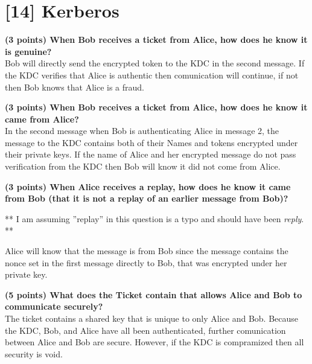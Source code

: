 \documentclass[letterpaper,11pt,notitlepage,fleqn]{article}
\begin{document}
\section{[14] Kerberos}
\noindent\textbf{(3 points) When Bob receives a ticket from Alice, how does he know it is genuine?} \\
Bob will directly send the encrypted token to the KDC in the second message. If the KDC verifies that Alice is authentic then comunication will continue, if not then Bob knows that Alice is a fraud.

\noindent\textbf{(3 points) When Bob receives a ticket from Alice, how does he know it came from Alice?} \\
In the second message when Bob is authenticating Alice in message 2, the message to the KDC contains both of their Names and tokens encrypted under their private keys. If the name of Alice and her encrypted message do not pass verification from the KDC then Bob will know it did not come from Alice.

\noindent\textbf{(3 points) When Alice receives a replay, how does he know it came from Bob (that it is not a replay of an earlier message from Bob)?} \\
\begin{center}
    ** I am assuming ''replay'' in this question is a typo and should have been \textit{reply}. **
\end{center}
Alice will know that the message is from Bob since the message contains the nonce set in the first message directly to Bob, that was encrypted under her private key. 

\noindent\textbf{(5 points) What does the Ticket contain that allows Alice and Bob to communicate securely?} \\
The ticket contains a shared key that is unique to only Alice and Bob. Because the KDC, Bob, and Alice have all been authenticated, further comunication between Alice and Bob are secure. However, if the KDC is compramized then all security is void.

\medskip


\end{document}
